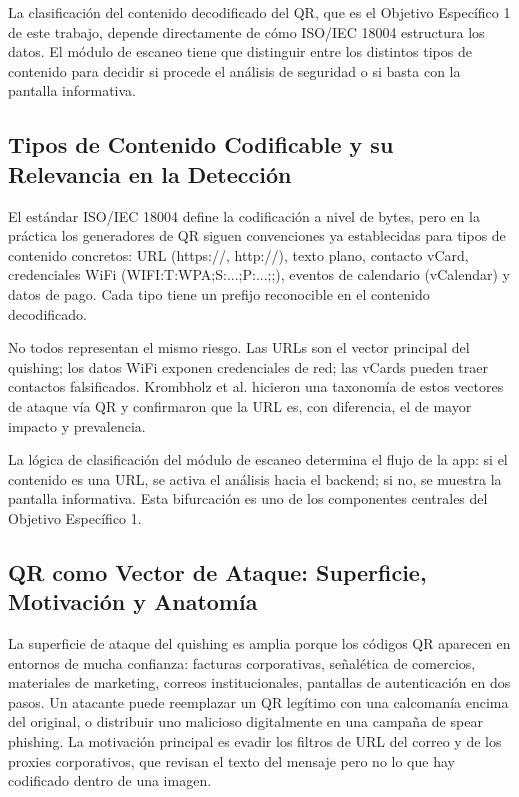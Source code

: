 La clasificaci\'on del contenido decodificado del QR, que es el Objetivo Espec\'ifico 1 de este trabajo, depende directamente de c\'omo ISO/IEC 18004 estructura los datos. El m\'odulo de escaneo tiene que distinguir entre los distintos tipos de contenido para decidir si procede el an\'alisis de seguridad o si basta con la pantalla informativa.

\subsection{Tipos de Contenido Codificable y su Relevancia en la Detecci\'on}

El est\'andar ISO/IEC 18004 define la codificaci\'on a nivel de bytes, pero en la pr\'actica los generadores de QR siguen convenciones ya establecidas para tipos de contenido concretos: URL (https://, http://), texto plano, contacto vCard, credenciales WiFi (WIFI:T:WPA;S:...;P:...;;), eventos de calendario (vCalendar) y datos de pago. Cada tipo tiene un prefijo reconocible en el contenido decodificado.

No todos representan el mismo riesgo. Las URLs son el vector principal del quishing; los datos WiFi exponen credenciales de red; las vCards pueden traer contactos falsificados. Krombholz et al. \cite{krombholz2014qr} hicieron una taxonom\'ia de estos vectores de ataque v\'ia QR y confirmaron que la URL es, con diferencia, el de mayor impacto y prevalencia.

La l\'ogica de clasificaci\'on del m\'odulo de escaneo determina el flujo de la app: si el contenido es una URL, se activa el an\'alisis hacia el backend; si no, se muestra la pantalla informativa. Esta bifurcaci\'on es uno de los componentes centrales del Objetivo Espec\'ifico 1.

\subsection{QR como Vector de Ataque: Superficie, Motivaci\'on y Anatom\'ia}

La superficie de ataque del quishing es amplia porque los c\'odigos QR aparecen en entornos de mucha confianza: facturas corporativas, se\~nal\'etica de comercios, materiales de marketing, correos institucionales, pantallas de autenticaci\'on en dos pasos. Un atacante puede reemplazar un QR leg\'itimo con una calcoman\'ia encima del original, o distribuir uno malicioso digitalmente en una campa\~na de spear phishing. La motivaci\'on principal es evadir los filtros de URL del correo y de los proxies corporativos, que revisan el texto del mensaje pero no lo que hay codificado dentro de una imagen.

